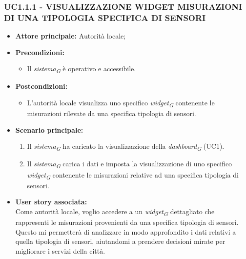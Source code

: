 \subsubsection{UC1.1.1 - VISUALIZZAZIONE WIDGET MISURAZIONI DI UNA TIPOLOGIA SPECIFICA DI SENSORI}

\begin{itemize}
    \item \textbf{Attore principale:} Autorità locale;
    \item \textbf{Precondizioni:}
        \begin{itemize}
            \item Il \textit{sistema}\textsubscript{\textit{G}} è operativo e accessibile.
        \end{itemize}
    \item \textbf{Postcondizioni:}
        \begin{itemize}
            \item L'autorità locale visualizza uno specifico \textit{widget}\textsubscript{\textit{G}} contenente le misurazioni rilevate da una specifica tipologia di sensori.
        \end{itemize}
    \item \textbf{Scenario principale:}
        \begin{enumerate}
            \item Il \textit{sistema}\textsubscript{\textit{G}} ha caricato la visualizzazione della \textit{dashboard}\textsubscript{\textit{G}} (UC1).
            \item Il \textit{sistema}\textsubscript{\textit{G}} carica i dati e imposta la visualizzazione di uno specifico \textit{widget}\textsubscript{\textit{G}} contenente le misurazioni relative ad una specifica tipologia di sensori.
        \end{enumerate}
    \item \textbf{User story associata:} \\
        Come autorità locale, voglio accedere a un \textit{widget}\textsubscript{\textit{G}} dettagliato che rappresenti le misurazioni provenienti da una specifica tipologia di sensori. Questo mi permetterà di analizzare in modo approfondito i dati relativi a quella tipologia di sensori, aiutandomi a prendere decisioni mirate per migliorare i servizi della città.
\end{itemize}